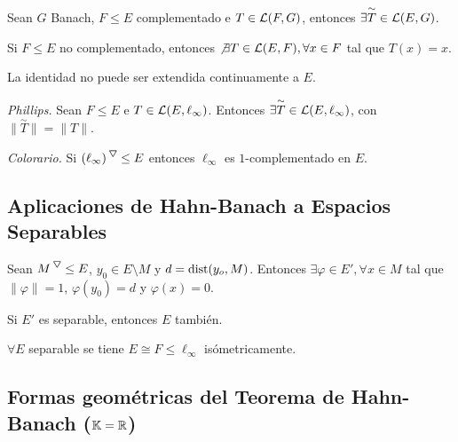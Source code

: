 \begin{proposition}
    Sean \(G\) Banach, \(F\leq E \) complementado e \(T \in \mathcal{L}(F,G)\), entonces \(\exists \overset{\sim}{T} \in \mathcal{L}(E,G)\). 
\end{proposition}
\begin{proposition}
    Si \(F\leq E\) no complementado, entonces \(\not\exists T\in \mathcal{L}(E,F), \forall x\in F \) tal que \(T(x) = x \).  
\end{proposition}
\begin{note}
    La identidad no puede ser extendida continuamente a \(E\). 
\end{note}
\begin{theorem}
    \emph{Phillips.} Sean \(F\leq E\) e \(T\in \mathcal{L}(E,\ell_\infty)\). Entonces \(\exists \overset{\sim}{T}\in \mathcal{L}(E, \ell_\infty)\), con \(\|\overset{\sim}{T}\| = \|T\|\). 
\end{theorem}
\begin{note}
   \emph{Colorario.}  Si \((\ell_\infty)^\ce \leq E\) entonces \(\ell_\infty\) es $1$-complementado en \(E\). 
\end{note}

\subsection*{Aplicaciones de Hahn-Banach a Espacios Separables}

\begin{proposition}
    Sean \(M^\ce \leq E\), \(y_0\in  E\setminus M\) y \(d = \textnormal{dist}(y_o,M)\). Entonces \(\exists \varphi \in E', \forall x\in M\) tal que \( \|\varphi\|=1 \), \(\varphi(y_0) = d\) y \(\varphi(x)=0\). 
\end{proposition}
\begin{theorem}
    Si \(E'\) es separable, entonces \(E\) también. 
\end{theorem}
\begin{proposition}
    \(\forall E\) separable se tiene \(E\cong F\leq \ell_\infty\) isómetricamente.  
\end{proposition}

\subsection*{Formas geométricas del Teorema de Hahn-Banach (\(\mathbb{K} = \mathbb{R}\)) }

